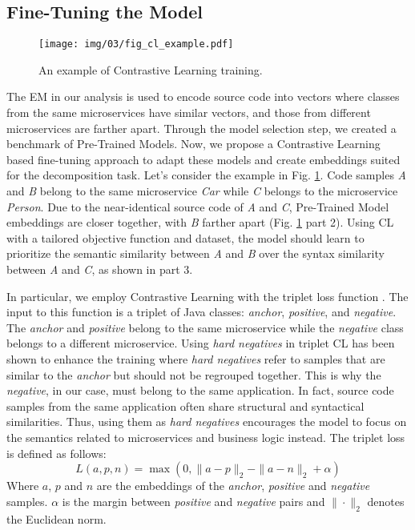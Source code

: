 
\subsection{Fine-Tuning the Model}\label{subsec:finetune}




\begin{figure}
\centering
\texttt{[image: img/03/fig\_cl\_example.pdf]}
\caption{An example of Contrastive Learning training.} \label{fig:clexample}
\end{figure}


The EM in our analysis is used to encode source code into vectors where classes from the same microservices have similar vectors, and those from different microservices are farther apart. Through the model selection step, we created a benchmark of Pre-Trained Models. Now, we propose a Contrastive Learning based fine-tuning approach to adapt these models and create embeddings suited for the decomposition task. Let's consider the example in Fig. \ref{fig:clexample}. Code samples \textit{A} and \textit{B} belong to the same microservice \textit{Car} while \textit{C} belongs to the microservice \textit{Person}. Due to the near-identical source code of \textit{A} and \textit{C}, Pre-Trained Model embeddings are closer together, with \textit{B} farther apart (Fig. \ref{fig:clexample} part 2). Using CL with a tailored objective function and dataset, the model should learn to prioritize the semantic similarity between \textit{A} and \textit{B} over the syntax similarity between \textit{A} and \textit{C}, as shown in part 3.

In particular, we employ Contrastive Learning with the triplet loss function \cite{florian2015triplet}. The input to this function is a triplet of Java classes: \textit{anchor}, \textit{positive}, and \textit{negative}. The \textit{anchor} and \textit{positive} belong to the same microservice while the \textit{negative} class belongs to a different microservice. Using \textit{hard negatives} in triplet CL has been shown to enhance the training \cite{florian2015triplet} where \textit{hard negatives} refer to samples that are similar to the \textit{anchor} but should not be regrouped together. This is why the \textit{negative}, in our case, must belong to the same application. In fact, source code samples from the same application often share structural and syntactical similarities. Thus, using them as \textit{hard negatives} encourages the model to focus on the semantics related to microservices and business logic instead. The triplet loss is defined as follows: 
\begin{equation}\label{eq:tripletloss}
L(a, p, n) = \max(0, \|a - p\|_2 - \|a - n\|_2 + \alpha)
\end{equation}
Where \(a\), \(p\) and \(n\) are the embeddings of the \textit{anchor}, \textit{positive} and \textit{negative} samples. \(\alpha\) is the margin between \textit{positive} and \textit{negative} pairs and \(\|\cdot\|_2\) denotes the Euclidean norm.





